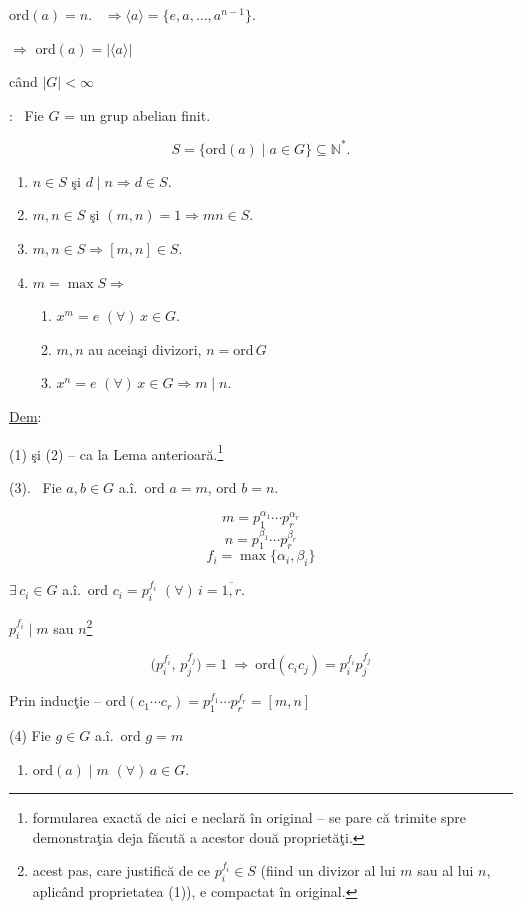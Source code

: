 \documentclass[12pt]{article}
\begin{document}
\noindent ord$(a)=n$. \ $\Rightarrow \langle a\rangle = \{e,a,\ldots,a^{n-1}\}$.

\noindent $\Rightarrow$ ord$(a) = |\langle a\rangle|$

\noindent când $|G|<\infty$

\bigskip
\noindent{}: \ Fie $G$ = un grup abelian finit.

\[
S=\{\text{ord}(a) \mid a\in G\} \subseteq \mathbb{N}^*.
\]

\begin{enumerate}
\item[(1)] $n\in S$ şi $d\mid n \Rightarrow d\in S$.
\item[(2)] $m,n\in S$ şi $(m,n)=1 \Rightarrow mn\in S$.
\item[(3)] $m,n\in S \Rightarrow [m,n]\in S$.
\item[(4)] $m=\max S \Rightarrow$
\begin{enumerate}
\item[(a)] $x^m=e$ $(\forall)\,x\in G$.
\item[(b)] $m,n$ au aceiaşi divizori, $n=$ord$\,G$
\item[(c)] $x^n=e$ $(\forall)\,x\in G \Rightarrow m\mid n$.
\end{enumerate}
\end{enumerate}

\bigskip
\noindent\underline{Dem}:

\noindent (1) şi (2) -- ca la Lema anterioară.\footnote{formularea exactă de aici e neclară în original -- se pare că trimite spre demonstraţia deja făcută a acestor două proprietăţi.}

\bigskip
\noindent (3). \ Fie $a,b\in G$ a.î.\ ord $a=m$, ord $b=n$.

\[
m=p_1^{\alpha_1}\cdots p_r^{\alpha_r}
\]
\[
n=p_1^{\beta_1}\cdots p_r^{\beta_r}
\]
\[
f_i=\max\{\alpha_i,\beta_i\}
\]

\noindent $\exists\, c_i\in G$ a.î.\ ord $c_i=p_i^{f_i}$ $(\forall)\,i=\overline{1,r}$.

\bigskip
\noindent $p_i^{f_i}\mid m$ sau $n$\footnote{acest pas, care justifică de ce $p_i^{f_i}\in S$ (fiind un divizor al lui $m$ sau al lui $n$, aplicând proprietatea (1)), e compactat în original.}

\[
\big(p_i^{f_i},\,p_j^{f_j}\big)=1 \ \Rightarrow \ \text{ord}(c_ic_j) = p_i^{f_i}p_j^{f_j}
\]

\bigskip
\noindent Prin inducţie -- ord$(c_1\cdots c_r) = p_1^{f_1}\cdots p_r^{f_r} = [m,n]$

\bigskip
\noindent (4) Fie $g\in G$ a.î.\ ord $g=m$

\begin{enumerate}
\item[(a)] ord$(a)\mid m$ $(\forall)\,a\in G$.
\end{enumerate}
\end{document}
